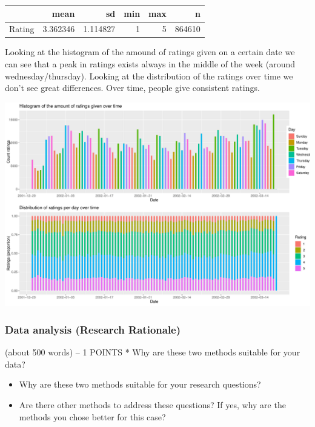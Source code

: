 \documentclass[
  man]{apa6}
\begin{document}
\begin{table}
\centering
\begin{tabular}{l|r|r|r|r|r}
\hline
  & mean & sd & min & max & n\\
\hline
Rating & 3.362346 & 1.114827 & 1 & 5 & 864610\\
\hline
\end{tabular}
\end{table}

Looking at the histogram of the amound of ratings given on a certain
date we can see that a peak in ratings exists always in the middle of
the week (around wednesday/thursday). Looking at the distribution of the
ratings over time we don't see great differences. Over time, people give
consistent ratings.

\includegraphics{tawab_backup_report_files/figure-latex/unnamed-chunk-5-1.pdf}

\hypertarget{data-analysis-research-rationale}{%
\subsubsection{Data analysis (Research
Rationale)}\label{data-analysis-research-rationale}}

(about 500 words) -- 1 POINTS * Why are these two methods suitable for
your data?

\begin{itemize}
\item
  Why are these two methods suitable for your research questions?
\item
  Are there other methods to address these questions? If yes, why are
  the methods you chose better for this case?
\end{itemize}
\end{document}
